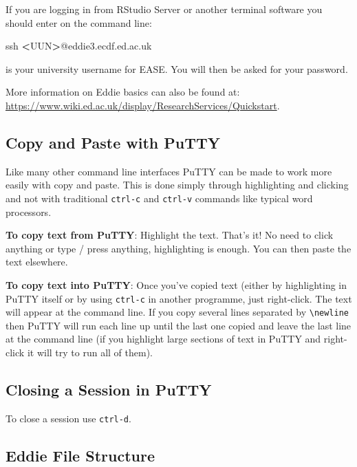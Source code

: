 \documentclass[]{book}
\newenvironment{Shaded}{\begin{snugshade}}{\end{snugshade}}
\newcommand{\FunctionTok}[1]{\textcolor[rgb]{0.00,0.00,0.00}{#1}}
\newcommand{\NormalTok}[1]{#1}
\newcommand{\OperatorTok}[1]{\textcolor[rgb]{0.81,0.36,0.00}{\textbf{#1}}}
\begin{document}
If you are logging in from RStudio Server or another terminal software you should enter on the command line:

\begin{Shaded}
\begin{Highlighting}[]
\FunctionTok{ssh} \OperatorTok{<}\NormalTok{UUN}\OperatorTok{>}\NormalTok{@eddie3.ecdf.ed.ac.uk}
\end{Highlighting}
\end{Shaded}

 is your university username for EASE. You will then be asked for your password.

More information on Eddie basics can also be found at: \url{https://www.wiki.ed.ac.uk/display/ResearchServices/Quickstart}.

\hypertarget{copy-and-paste-with-putty}{%
\subsection{Copy and Paste with PuTTY}\label{copy-and-paste-with-putty}}

Like many other command line interfaces PuTTY can be made to work more easily with copy and paste. This is done simply through highlighting and clicking and not with traditional \texttt{ctrl-c} and \texttt{ctrl-v} commands like typical word processors.

\textbf{To copy text from PuTTY}: Highlight the text. That's it! No need to click anything or type / press anything, highlighting is enough. You can then paste the text elsewhere.

\textbf{To copy text into PuTTY}: Once you've copied text (either by highlighting in PuTTY itself or by using \texttt{ctrl-c} in another programme, just right-click. The text will appear at the command line. If you copy several lines separated by \texttt{\textbackslash{}newline} then PuTTY will run each line up until the last one copied and leave the last line at the command line (if you highlight large sections of text in PuTTY and right-click it will try to run all of them).

\hypertarget{closing-a-session-in-putty}{%
\subsection{Closing a Session in PuTTY}\label{closing-a-session-in-putty}}

To close a session use \texttt{ctrl-d}.

\hypertarget{eddie-file-structure}{%
\subsection{Eddie File Structure}\label{eddie-file-structure}}
\end{document}
